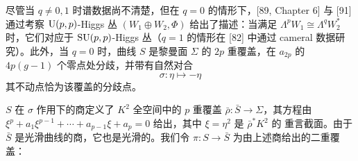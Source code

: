 

尽管当 $q\ne 0,1$ 时谱数据尚不清楚，但在 $q=0$ 的情形下，[89, Chapter 6] 与 [91] 通过考察 $\mathrm{U}(p,p)$-Higgs 丛 $(W_1\oplus W_2,\Phi)$ 给出了描述：当满足 $\Lambda^pW_1\cong\Lambda^qW_2^*$ 时，它们对应于 $\mathrm{SU}(p,p)$-Higgs 丛（$q=1$ 的情形在 [82] 中通过 cameral 数据研究）。此外，当 $q=0$ 时，曲线 $S$ 是黎曼面 $\Sigma$ 的 $2p$ 重覆盖，在 $a_{2p}$ 的 $4p(g-1)$ 个零点处分歧，并带有自然对合
\begin{equation}
\sigma:\eta\mapsto-\eta \tag{3.9}
\end{equation}
其不动点恰为该覆盖的分歧点。


$S$ 在 $\sigma$ 作用下的商定义了 $K^2$ 全空间中的 $p$ 重覆盖 $\bar\rho:\bar S\to\Sigma$，其方程由 $\xi^p+a_1\xi^{p-1}+\cdots+a_{p-1}\xi+a_p=0$ 给出，其中 $\xi=\eta^2$ 是 $\bar\rho^*K^2$ 的 重言截面。由于 $\bar S$ 是光滑曲线的商，它也是光滑的。我们令 $\pi:S\to\bar S$ 为由上述商给出的二重覆盖：
\begin{center}
\end{center}

